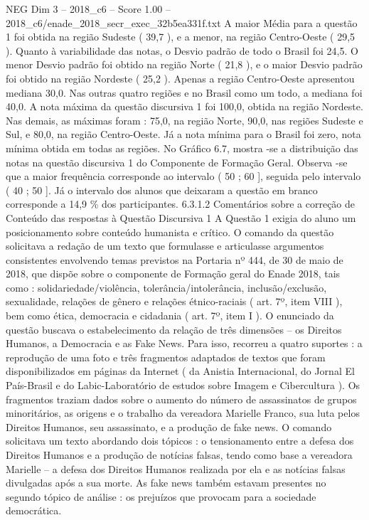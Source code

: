 \begin{textsample}{NEG Dim 3 – 2018\_c6 – Score 1.00 – 2018\_c6/enade\_2018\_secr\_exec\_32b5ea331f.txt}
A maior Média para a questão 1 foi obtida na região Sudeste ( 39,7 ), e a menor, na região Centro-Oeste ( 29,5 ).
Quanto à variabilidade das notas, o Desvio padrão de todo o Brasil foi 24,5.
O menor Desvio padrão foi obtido na região Norte ( 21,8 ), e o maior Desvio padrão foi obtido na região Nordeste ( 25,2 ).
Apenas a região Centro-Oeste apresentou mediana 30,0.
Nas outras quatro regiões e no Brasil como um todo, a mediana foi 40,0.
A nota máxima da questão discursiva 1 foi 100,0, obtida na região Nordeste.
Nas demais, as máximas foram : 75,0, na região Norte, 90,0, nas regiões Sudeste e Sul, e 80,0, na região Centro-Oeste.
Já a nota mínima para o Brasil foi zero, nota mínima obtida em todas as regiões.
No Gráfico 6.7, mostra -se a distribuição das notas na questão discursiva 1 do Componente de Formação Geral.
Observa -se que a maior frequência corresponde ao intervalo ( 50 ; 60 ], seguida pelo intervalo ( 40 ; 50 ].
Já o intervalo dos alunos que deixaram a questão em branco corresponde a 14,9 \% dos participantes. 6.3.1.2 Comentários sobre a correção de Conteúdo das respostas à Questão Discursiva 1 A Questão 1 exigia do aluno um posicionamento sobre conteúdo humanista e crítico.
O comando da questão solicitava a redação de um texto que formulasse e articulasse argumentos consistentes envolvendo temas previstos na Portaria nº 444, de 30 de maio de 2018, que dispõe sobre o componente de Formação geral do Enade 2018, tais como : solidariedade/violência, tolerância/intolerância, inclusão/exclusão, sexualidade, relações de gênero e relações étnico-raciais ( art. 7º, item VIII ), bem como ética, democracia e cidadania ( art. 7º, item I ).
O enunciado da questão buscava o estabelecimento da relação de três dimensões – os Direitos Humanos, a Democracia e as Fake News.
Para isso, recorreu a quatro suportes : a reprodução de uma foto e três fragmentos adaptados de textos que foram disponibilizados em páginas da Internet ( da Anistia Internacional, do Jornal El País-Brasil e do Labic-Laboratório de estudos sobre Imagem e Cibercultura ).
Os fragmentos traziam dados sobre o aumento do número de assassinatos de grupos minoritários, as origens e o trabalho da vereadora Marielle Franco, sua luta pelos Direitos Humanos, seu assassinato, e a produção de fake news.
O comando solicitava um texto abordando dois tópicos : o tensionamento entre a defesa dos Direitos Humanos e a produção de notícias falsas, tendo como base a vereadora Marielle – a defesa dos Direitos Humanos realizada por ela e as notícias falsas divulgadas após a sua morte.
As fake news também estavam presentes no segundo tópico de análise : os prejuízos que provocam para a sociedade democrática.

\end{textsample}
